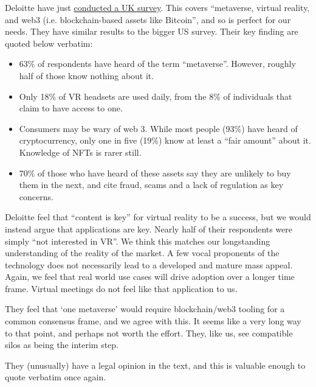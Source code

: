 Deloitte have just \href{https://www2.deloitte.com/uk/en/pages/technology-media-and-telecommunications/articles/digital-consumer-trends-2022-metaverse.html}{conducted a UK survey}. This covers ``metaverse, virtual reality, and web3 (i.e. blockchain-based assets like Bitcoin'', and so is perfect for our needs. They have similar results to the bigger US survey. Their key finding are quoted below verbatim:
\begin{itemize}
\item 63\% of respondents have heard of the term ``metaverse''. However, roughly half of those know nothing about it. 
\item Only 18\% of VR headsets are used daily, from the 8\% of individuals that claim to have access to one.
\item Consumers may be wary of web 3. While most people (93\%) have heard of cryptocurrency, only one in five (19\%) know at least a ``fair amount'' about it. Knowledge of NFTs is rarer still. 
\item 70\% of those who have heard of these assets say they are unlikely to buy them in the next, and cite fraud, scams and a lack of regulation as key concerns. 
\end{itemize}
Deloitte feel that ``content is key'' for virtual reality to be a success, but we would instead argue that applications are key. Nearly half of their respondents were simply ``not interested in VR''. We think this matches our longstanding understanding of the reality of the market. A few vocal proponents of the technology does not necessarily lead to a developed and mature mass appeal. Again, we feel that real world use cases will drive adoption over a longer time frame. Virtual meetings do not feel like that application to us.\par
They feel that `one metaverse' would require blockchain/web3 tooling for a common consensus frame, and we agree with this. It seems like a very long way to that point, and perhaps not worth the effort. They, like us, see compatible silos as being the interim step.\par 
They (unusually) have a legal opinion in the text, and this is valuable enough to quote verbatim once again.
